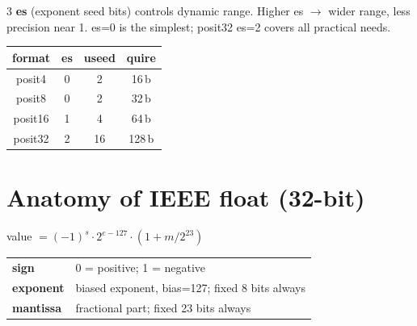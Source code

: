 \documentclass[10pt]{article}
\begin{document}
\begin{multicols}{3}
\smallskip
\noindent\small \textbf{es} (exponent seed bits) controls dynamic range.
Higher es $\to$ wider range, less precision near 1.
es=0 is the simplest; posit32 es=2 covers all practical needs.

\begin{center}\small
\begin{tabular}{cccc}
\toprule
format & es & useed & quire \\
\midrule
posit4  & 0 &  2 & 16\,b \\
posit8  & 0 &  2 & 32\,b \\
posit16 & 1 &  4 & 64\,b \\
posit32 & 2 & 16 & 128\,b \\
\bottomrule
\end{tabular}
\end{center}

\columnbreak

\section*{Anatomy of IEEE float (32-bit)}

\begin{center}
\end{center}

\noindent value $= (-1)^s \cdot 2^{e-127} \cdot (1 + m/2^{23})$

\smallskip
\begin{tabular}{@{}lp{4.8cm}@{}}
\textbf{sign}     & 0 = positive; 1 = negative \\[1pt]
\textbf{exponent} & biased exponent, bias=127; fixed 8 bits always \\[1pt]
\textbf{mantissa} & fractional part; fixed 23 bits always \\
\end{tabular}


\end{multicols}
\end{document}
